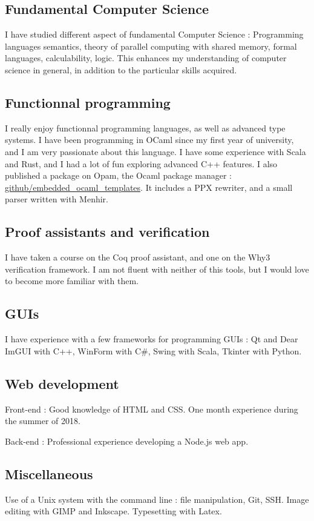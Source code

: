 \documentclass[10pt, a4paper, roman, french]{moderncv}
\begin{document}
	
		\subsection{Fundamental Computer Science}
			I have studied different aspect of fundamental Computer Science :
Programming languages semantics, theory of parallel computing with shared memory, formal languages, calculability, logic.
This enhances my understanding of computer science in general, in addition to the particular skills acquired.

	
		\subsection{Functionnal programming}
			I really enjoy functionnal programming languages, as well as advanced type systems. I have been programming in OCaml since my first year of university, and I am very passionate about this language. I have some experience with Scala and Rust, and I had a lot of fun exploring advanced C++ features.
I also published a package on Opam, the Ocaml package manager : \href{https://github.com/EmileTrotignon/embedded\_ocaml\_templates}{github/embedded\_ocaml\_templates}.
It includes a PPX rewriter, and a small parser written with Menhir.

	
		\subsection{Proof assistants and verification}
			I have taken a course on the Coq proof assistant, and one on the Why3 verification framework. I am not fluent with neither of this tools, but I would love to become more familiar with them.

	
		\subsection{GUIs}
			I have experience with a few frameworks for programming GUIs :
Qt and Dear ImGUI with C++, WinForm with C\#, Swing with Scala, Tkinter with Python.

	
		\subsection{Web development}
			Front-end : Good knowledge of HTML and CSS. One month experience during the summer of 2018.

Back-end : Professional experience developing a Node.js web app.

	
		\subsection{Miscellaneous}
			Use of a Unix system with the command line : file manipulation, Git, SSH.
Image editing with GIMP and Inkscape.
Typesetting with Latex.

	
\end{document}
